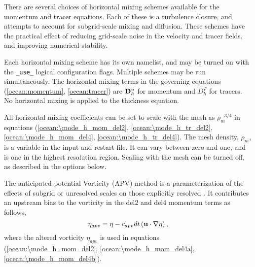 There are several choices of horizontal mixing schemes available for the 
momentum and tracer equations.  Each of these is a turbulence closure, 
and attempts to account for subgrid-scale mixing and diffusion.  These 
schemes have the practical effect of reducing grid-scale noise in the 
velocity and tracer fields, and improving numerical stability.

Each horizontal mixing scheme has its own namelist, and may be turned
on with the \verb|_use_| logical configuration flags.  Multiple
schemes may be run simultaneously.  The horizontal mixing terms in the
governing equations (\ref{ocean:momentum},
\ref{ocean:tracer}) are ${\bf D}^u_h$ for momentum and
$D^\varphi_h$ for tracers.  No horizontal mixing is applied to the
thickness equation.

All horizontal mixing coefficients can be set to scale with the mesh as $\rho_m^{-3/4}$ in equations (\ref{ocean:\mode_h_mom_del2}, \ref{ocean:\mode_h_tr_del2}, \ref{ocean:\mode_h_mom_del4}, \ref{ocean:\mode_h_tr_del4}).  The mesh density, $\rho_m$, is a variable in the input and restart file.  It can vary between zero and one, and is one in the highest resolution region.  Scaling with the mesh can be turned off, as described in the options below.

The anticipated potential Vorticity (APV) method is a parameterization of the effects of subgrid or unresolved scales on those explicitly resolved \citep{Vallis_Hua88jas}.  It contributes an upstream bias to the vorticity in the del2 and del4 momentum terms as follows,
\begin{equation}
\eta_{apv} = \eta - c_{apv} dt \left({\bf u}\cdot \nabla \eta\right),
\end{equation}
where the altered vorticity $\eta_{apv}$ is used in equations (\ref{ocean:\mode_h_mom_del2}, \ref{ocean:\mode_h_mom_del4a}, \ref{ocean:\mode_h_mom_del4b}).
